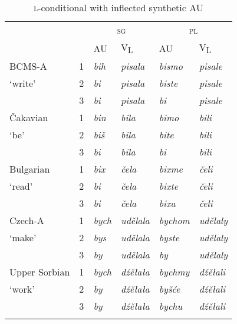 \documentclass[output=paper]{langscibook}
\begin{document}
\begin{table}[p]
\begin{tabular}{llllll}
\lsptoprule
& & \multicolumn{2}{c}{\textsc{sg}} & \multicolumn{2}{c}{\textsc{pl}} \\ \cmidrule(lr){3-4}\cmidrule(lr){5-6}
& & AU & V\textsubscript{L} & AU & V\textsubscript{L} \\
\midrule
BCMS-A & 1 & \textit{bih} & \textit{pisala} & \textit{bismo} & \textit{pisale} \\ 
`write'    & 2 & \textit{bi} & \textit{pisala} & \textit{biste} & \textit{pisale} \\ 
& 3 & \textit{bi} & \textit{pisala} & \textit{bi} & \textit{pisale} \\\addlinespace
Čakavian & 1 & \textit{bin} & \textit{bila} & \textit{bimo} & \textit{bili} \\ 
`be' & 2 & \textit{biš} & \textit{bila} & \textit{bite} & \textit{bili} \\
 & 3 & \textit{bi} & \textit{bila} & \textit{bi} & \textit{bili} \\\addlinespace
Bulgarian & 1 & \textit{bix} & \textit{\v{c}ela} & \textit{bixme} & \textit{\v{c}eli} \\ 
`read'    & 2 & \textit{bi} & \textit{\v{c}ela} & \textit{bixte} & \textit{\v{c}eli} \\ 
            & 3 & \textit{bi} & \textit{\v{c}ela} & \textit{bixa} & \textit{\v{c}eli} \\\addlinespace
Czech-A & 1 & \textit{bych} & \textit{udělala} & \textit{bychom} & \textit{udělaly} \\ 
`make' & 2 & \textit{bys} & \textit{udělala} & \textit{byste} & \textit{udělaly} \\
 & 3 & \textit{by} & \textit{udělala} & \textit{by} & \textit{udělaly} \\\addlinespace
Upper Sorbian & 1 & \textit{bych} & \textit{dźěłała} & \textit{bychmy} & \textit{dźěłali} \\ 
`work'   & 2 & \textit{by} & \textit{dźěłała} & \textit{by\v{s}će} & \textit{dźěłali} \\ 
         & 3 & \textit{by} & \textit{dźěłała} & \textit{bychu} & \textit{dźěłali} \\
\lspbottomrule
\end{tabular}
    \caption{\textsc{l-}conditional with inflected synthetic AU}
    \label{pitsch:tab:conditional_synthetic}
\end{table}

\end{document}

